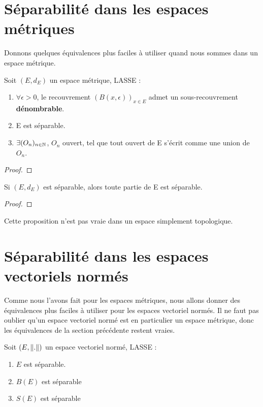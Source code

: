 \section{Séparabilité dans les espaces métriques}

Donnons quelques équivalences plus faciles à utiliser quand nous sommes dans un
espace métrique.

\begin{proposition}
	Soit $(E, d_{E})$ un espace métrique, LASSE :
	\begin{enumerate}
		\item $\forall \epsilon > 0$, le recouvrement $(B(x, \epsilon))_{x \in
			E}$ admet un sous-recouvrement \textbf{dénombrable}.
		\item E est séparable.
		\item $\exists (O_{n})_{n \in \mathbb{N}}$, $O_{n}$ ouvert, tel que
			tout ouvert de E s'écrit comme une union de $O_{n}$.
	\end{enumerate}
\end{proposition}

\begin{proof}

\end{proof}

\begin{proposition}
	Si $(E, d_{E})$ est séparable, alors toute partie de E est séparable.
\end{proposition}

\begin{proof}

\end{proof}

\begin{remarque}
	Cette proposition n'est pas vraie dans un espace simplement topologique.
\end{remarque}

\section{Séparabilité dans les espaces vectoriels normés}

Comme nous l'avons fait pour les espaces métriques, nous allons donner des
équivalences plus faciles à utiliser pour les espaces vectoriel normés. Il ne
faut pas oublier qu'un espace vectoriel normé est en particulier un espace
métrique, donc les équivalences de la section précédente restent vraies.

\begin{proposition}
	Soit $(E, \norm{.})$ un espace vectoriel normé, LASSE :
	\begin{enumerate}
		\item $E$ est séparable.
		\item $B(E)$ est séparable
		\item $S(E)$ est séparable
	\end{enumerate}
\end{proposition}

